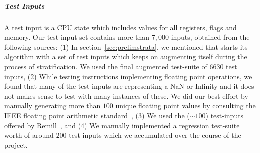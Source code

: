 \subparagraph{Test Inputs} %
A test input is a CPU state which includes values for all registers, flags and memory. Our test input set contains more than $7,000$ inputs, obtained from the following sources: 
%    
(1) In section~\ref{sec:prelimstrata}, we mentioned that \Strata starts its algorithm with a set of test inputs which keeps on augmenting itself during the process of stratification. We used the final augmented test-suite of  $6630$ test inputs,
(2) While testing instructions implementing floating point operations, we found that many of the test inputs are representing a NaN or Infinity and it does not makes sense to test with many instances of these. We did our best effort by manually generating more than $100$ unique floating point values by  consulting the IEEE floating point arithmetic standard~\cite{FP}, 
(3) We used the (${\sim}100$) test-inputs offered by Remill~\cite{Remill}, and 
(4) We manually implemented a regression test-suite worth of around $200$ test-inputs which we accumulated over the course of the project.


